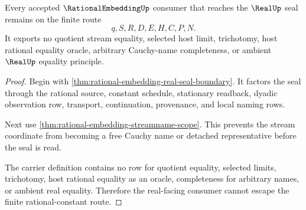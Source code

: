 \begin{theorem}
\label{thm:rational-embedding-nonescape}
Every accepted $\RationalEmbeddingUp$ consumer that reaches the $\RealUp$ seal remains on the finite route
$$
q,S,R,D,E,H,C,P,N.
$$
It exports no quotient stream equality, selected host limit, trichotomy, host rational equality oracle, arbitrary Cauchy-name completeness, or ambient $\RealUp$ equality principle.
\end{theorem}
\begin{proof}
Begin with \autoref{thm:rational-embedding-real-seal-boundary}. It factors the seal through the rational source, constant schedule, stationary readback, dyadic observation row, transport, continuation, provenance, and local naming rows.

Next use \autoref{thm:rational-embedding-streamname-scope}. This prevents the stream coordinate from becoming a free Cauchy name or detached representative before the seal is read.

The carrier definition contains no row for quotient equality, selected limits, trichotomy, host rational equality as an oracle, completeness for arbitrary names, or ambient real equality. Therefore the real-facing consumer cannot escape the finite rational-constant route.
\end{proof}

